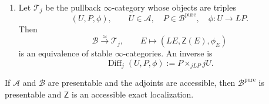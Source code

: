 \begin{theorem}
\begin{enumerate}[label=(\roman*)]
    \item Let \(\mathcal T_j\) be the pullback \(\infty\)-category whose
    objects are triples
    \[
        (U,P,\phi),
        \qquad
        U\in\mathcal A,
        \quad
        P\in\mathcal B^{\mathrm{pure}},
        \quad
        \phi:U\to LP.
    \]
    Then
    \[
        \mathcal B\xrightarrow{\simeq}\mathcal T_j,
        \qquad
        E\longmapsto(LE,\mathsf Z(E),\phi_E)
    \]
    is an equivalence of stable \(\infty\)-categories. An inverse is
    \[
        \operatorname{Diff}_j(U,P,\phi)
        :=
        P\times_{jLP}jU.
    \]
\end{enumerate}
If \(\mathcal A\) and \(\mathcal B\) are presentable and the adjoints are
accessible, then \(\mathcal B^{\mathrm{pure}}\) is presentable and
\(\mathsf Z\) is an accessible exact localization.
\end{theorem}

